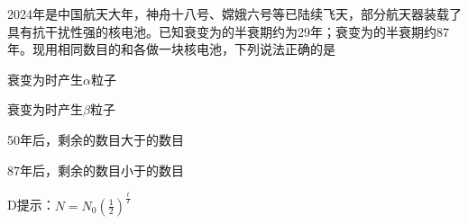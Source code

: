 2024年是中国航天大年，神舟十八号、嫦娥六号等已陆续飞天，部分航天器装载了具有抗干扰性强的核电池。已知衰变为的半衰期约为29年；衰变为的半衰期约87年。现用相同数目的和各做一块核电池，下列说法正确的是\paren[]
\begin{choices}
	\item {}衰变为时产生\(\alpha\)粒子
	\item {}衰变为时产生\(\beta\)粒子
	\item 50年后，剩余的数目大于的数目
	\item 87年后，剩余的数目小于的数目
\end{choices}
\begin{answer}
	D\quad 提示：\(N = N_0 (\frac{1}{2})^{\frac{t}{T}}\)
\end{answer}